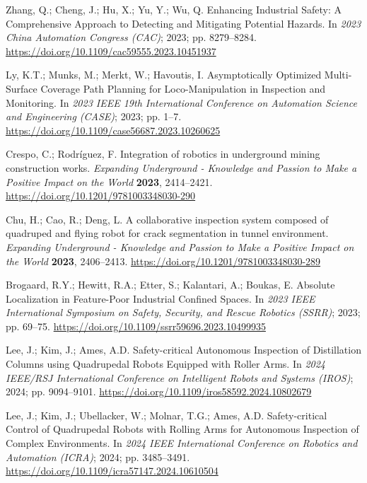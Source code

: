 Zhang, Q.; Cheng, J.; Hu, X.; Yu, Y.; Wu, Q. Enhancing Industrial Safety: A Comprehensive Approach to Detecting and Mitigating Potential Hazards. In \emph{2023 China Automation Congress (CAC)}; 2023; pp. 8279--8284. \url{https://doi.org/10.1109/cac59555.2023.10451937}

Ly, K.T.; Munks, M.; Merkt, W.; Havoutis, I. Asymptotically Optimized Multi-Surface Coverage Path Planning for Loco-Manipulation in Inspection and Monitoring. In \emph{2023 IEEE 19th International Conference on Automation Science and Engineering (CASE)}; 2023; pp. 1--7. \url{https://doi.org/10.1109/case56687.2023.10260625}

Crespo, C.; Rodríguez, F. Integration of robotics in underground mining construction works. \emph{Expanding Underground - Knowledge and Passion to Make a Positive Impact on the World} \textbf{2023}, 2414--2421. \url{https://doi.org/10.1201/9781003348030-290}

Chu, H.; Cao, R.; Deng, L. A collaborative inspection system composed of quadruped and flying robot for crack segmentation in tunnel environment. \emph{Expanding Underground - Knowledge and Passion to Make a Positive Impact on the World} \textbf{2023}, 2406--2413. \url{https://doi.org/10.1201/9781003348030-289}

Brogaard, R.Y.; Hewitt, R.A.; Etter, S.; Kalantari, A.; Boukas, E. Absolute Localization in Feature-Poor Industrial Confined Spaces. In \emph{2023 IEEE International Symposium on Safety, Security, and Rescue Robotics (SSRR)}; 2023; pp. 69--75. \url{https://doi.org/10.1109/ssrr59696.2023.10499935}

Lee, J.; Kim, J.; Ames, A.D. Safety-critical Autonomous Inspection of Distillation Columns using Quadrupedal Robots Equipped with Roller Arms. In \emph{2024 IEEE/RSJ International Conference on Intelligent Robots and Systems (IROS)}; 2024; pp. 9094--9101. \url{https://doi.org/10.1109/iros58592.2024.10802679}

Lee, J.; Kim, J.; Ubellacker, W.; Molnar, T.G.; Ames, A.D. Safety-critical Control of Quadrupedal Robots with Rolling Arms for Autonomous Inspection of Complex Environments. In \emph{2024 IEEE International Conference on Robotics and Automation (ICRA)}; 2024; pp. 3485--3491. \url{https://doi.org/10.1109/icra57147.2024.10610504}

